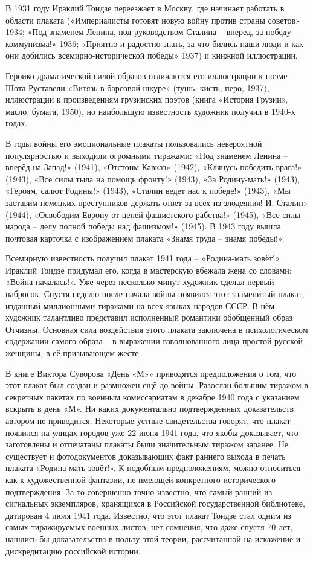 В 1931 году Ираклий Тоидзе переезжает в Москву, где начинает работать в области
плаката («Империалисты готовят новую войну против страны советов» 1934; «Под
знаменем Ленина, под руководством Сталина – вперед, за победу коммунизма!»
1936; «Приятно и радостно знать, за что бились наши люди и как они добились
всемирно-исторической победы» 1937) и книжной иллюстрации.

Героико-драматической силой образов отличаются его иллюстрации к поэме Шота
Руставели «Витязь в барсовой шкуре» (тушь, кисть, перо, 1937), иллюстрации к
произведениям грузинских поэтов (книга «История Грузии», масло, бумага, 1950),
но наибольшую известность художник получил в 1940-х годах.

В годы войны его эмоциональные плакаты пользовались невероятной популярностью и
выходили огромными тиражами: «Под знаменем Ленина – вперёд на Запад!» (1941),
«Отстоим Кавказ» (1942), «Клянусь победить врага!» (1943), «Все силы тыла на
помощь фронту!» (1943), «За Родину-мать!» (1943), «Героям, салют Родины!»
(1943), «Сталин ведет нас к победе!» (1943), «Мы заставим немецких преступников
держать ответ за всех из злодеяния! И. Сталин» (1944), «Освободим Европу от
цепей фашистского рабства!» (1945), «Все силы народа – делу полной победы над
фашизмом!» (1945). В 1943 году вышла почтовая карточка с изображением плаката
«Знамя труда – знамя победы!».

Всемирную известность получил плакат 1941 года – «Родина-мать зовёт!». Ираклий
Тоидзе придумал его, когда в мастерскую вбежала жена со словами: «Война
началась!». Уже через несколько минут художник сделал первый набросок. Спустя
неделю после начала войны появился этот знаменитый плакат, изданный миллионными
тиражами на всех языках народов СССР. В нём художник талантливо представил
исполненный романтики обобщенный образ Отчизны. Основная сила воздействия этого
плаката заключена в психологическом содержании самого образа – в выражении
взволнованного лица простой русской женщины, в её призывающем жесте.

В книге Виктора Суворова «День «М»» приводятся предположения о том, что этот
плакат был создан и размножен ещё до войны. Разослан большим тиражом в
секретных пакетах по военным комиссариатам в декабре 1940 года с указанием
вскрыть в день «М». Ни каких документально подтверждённых доказательств автором
не приводится. Некоторые устные свидетельства говорят, что плакат появился на
улицах городов уже 22 июня 1941 года, что якобы доказывает, что заготовлены и
отпечатаны плакаты были значительным тиражом заранее. Не существует и
фотодокументов доказывающих факт раннего выхода в печать плаката «Родина-мать
зовёт!». К подобным предположениям, можно относиться как к художественной
фантазии, не имеющей конкретного исторического подтверждения. За то совершенно
точно известно, что самый ранний из сигнальных экземпляров, хранящихся в
Российской государственной библиотеке, датирован 4 июля 1941 года. Известно,
что этот плакат Тоидзе стал одним из самых тиражируемых военных листов, нет
сомнения, что даже спустя 70 лет, нашлись бы доказательства в пользу этой
теории, рассчитанной на искажение и дискредитацию российской истории.

